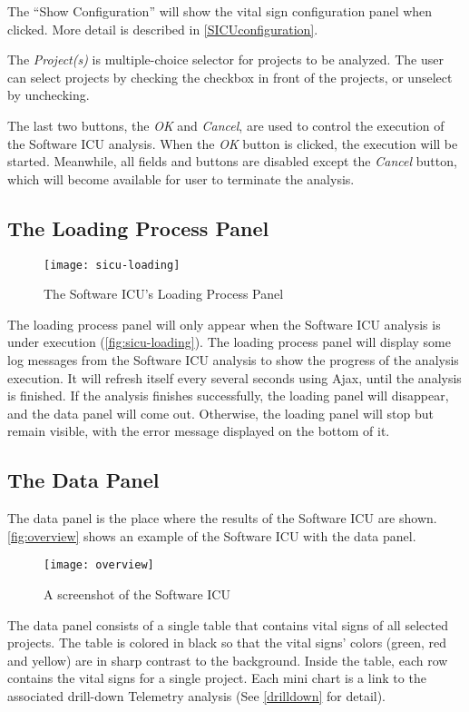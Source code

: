The ``Show Configuration'' will show the vital sign configuration panel when clicked. More detail is described in \autoref{SICUconfiguration}.

The {\it Project(s)} is multiple-choice selector for projects to be analyzed. The user can select projects by checking the checkbox in front of the projects, or unselect by unchecking. 

The last two buttons, the {\it OK} and {\it Cancel}, are used to control the execution of the Software ICU analysis. When the {\it OK} button is clicked, the execution will be started. Meanwhile, all fields and buttons are disabled except the {\it Cancel} button, which will become available for user to terminate the analysis. 

\subsection{The Loading Process Panel}
\begin{figure}[htbp]
   \centering
   \texttt{[image: sicu-loading]}
   \caption{The Software ICU's Loading Process Panel}
   \label{fig:sicu-loading}
\end{figure}
The loading process panel will only appear when the Software ICU analysis is under execution (\autoref{fig:sicu-loading}). The loading process panel will display some log messages from the Software ICU analysis to show the progress of the analysis execution. It will refresh itself every several seconds using Ajax, until the analysis is finished. If the analysis finishes successfully, the loading panel will disappear, and the data panel will come out. Otherwise, the loading panel will stop but remain visible, with the error message displayed on the bottom of it.

\subsection{The Data Panel}
The data panel is the place where the results of the Software ICU are shown. \autoref{fig:overview} shows an example of the Software ICU with the data panel. 

\begin{figure}[htbp]
   \centering
   \texttt{[image: overview]}
   \caption{A screenshot of the Software ICU}
   \label{fig:overview}
\end{figure}

The data panel consists of a single table that contains vital signs of all selected projects. The table is colored in black so that the vital signs' colors (green, red and yellow) are in sharp contrast to the background. Inside the table, each row contains the vital signs for a single project. Each mini chart is a link to the associated drill-down Telemetry analysis (See \autoref{drilldown} for detail).

